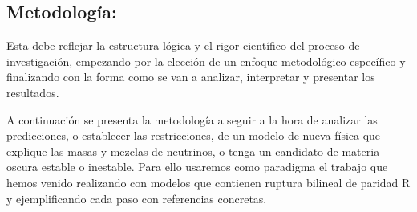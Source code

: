 \subsection{Metodología:                                   }
\begin{instrucciones}
  Esta debe reflejar la estructura lógica y el rigor científico del
  proceso de investigación, empezando por la elección de un enfoque
  metodológico específico y finalizando con la forma como se van a
  analizar, interpretar y presentar los resultados.
\end{instrucciones}

A continuación se presenta la metodología a seguir a la hora de
analizar las predicciones, o establecer las restricciones, de un
modelo de nueva física que explique las masas y mezclas de neutrinos,
o tenga un candidato de materia oscura estable o inestable. Para
ello usaremos como paradigma el trabajo que hemos venido realizando
con modelos que contienen ruptura bilineal de paridad R y ejemplificando cada
paso con referencias concretas.
